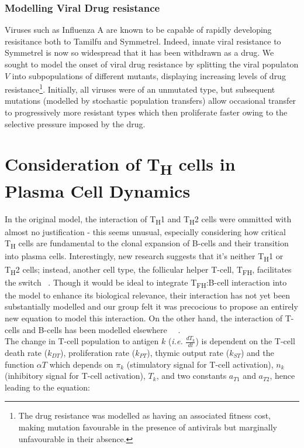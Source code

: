 \documentclass[a4paper, 12pt]{report}
\begin{document}
\subsubsection{Modelling Viral Drug resistance}

Viruses such as Influenza A are known to be capable of rapidly developing resisitance both to Tamilfu and Symmetrel.
Indeed, innate viral resistance to Symmetrel is now so widespread that it has been withdrawn as a drug.
We sought to model the onset of viral drug resistance by splitting the viral populaton $V$ into subpopulations of different mutants, displaying increasing levels of drug resistance\footnote{The drug resistance was modelled as having an associated fitness cost, making mutation favourable in the presence of antivirals but marginally unfavourable in their absence.}. Initially, all viruses were of an unmutated type, but subsequent mutations (modelled by stochastic population transfers) allow occasional transfer to progressively more resistant types which then proliferate faster owing to the selective pressure imposed by the drug.

\section{Consideration of T\textsubscript{H} cells in Plasma Cell Dynamics} %
In the original model, the interaction of T\textsubscript{H}1 and T\textsubscript{H}2 cells were ommitted with almost no justification - this seems unusual, especially considering how critical T\textsubscript{H} cells are fundamental to the clonal expansion of B-cells and their transition into plasma cells. Interestingly, new research suggests that it's neither T\textsubscript{H}1 or T\textsubscript{H}2 cells; instead, another cell type, the follicular helper T-cell, T\textsubscript{FH}, facilitates the switch ~\cite{Swain}. Though it would be ideal to integrate T\textsubscript{FH}:B-cell interaction into the model to enhance its biological relevance, their interaction has not yet been substantially modelled and our group felt it was precocious to propose an entirely new equation to model this interaction. On the other hand, the interaction of T-cells and B-cells has been modelled elsewhere ~\cite{Carneiro1}~\cite{Carneiro2}.\\ 

The change in T-cell population to antigen $k$ (\emph{i.e.} $\frac{dT_k}{dt}$) is dependent on the T-cell death rate ($k_{DT}$), proliferation rate ($k_{PT}$), thymic output rate ($k_{ST}$) and the function $\alpha{T}$ which depends on $\pi_{k}$ (stimulatory signal for T-cell activation), $n_{k}$ (inhibitory signal for T-cell activation), $T_{k}$, and two constants $a_{T1}$ and $a_{T2}$, hence leading to the equation:
\end{document}
